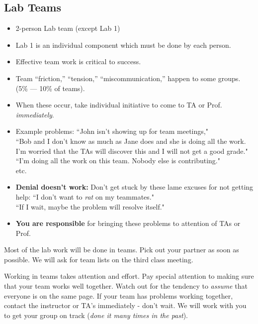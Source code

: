 \documentclass{article}	%
\begin{document}
\subsection{Lab Teams}

\begin{itemize}
        \item  2-person Lab team (except Lab 1)
        \item  Lab 1 is an individual component which must be done by each person. 
        \item Effective team work is critical to success.
        \item Team ``friction,'' ``tension,'' ``miscommunication,''
        happen to some groups. (5\% --- 10\% of teams).
        \item When these occur, take individual initiative to come
        to TA or Prof. {\it immediately}.
        \item Example problems: ``John isn't showing up for team meetings," \\
        ``Bob and I don't know as much as Jane does and
        she is doing all the work.  I'm worried that the TAs will discover
        this and I will not get a good grade." \\
        ``I'm doing all the work on this team.  Nobody else is contributing."\\
        etc.
        \item {\bf Denial doesn't work:} Don't get stuck by these lame excuses
        for not getting help: ``I don't want to {\it rat} on my teammates."\\
        ``If I wait, maybe the problem will resolve itself."
        \item {\bf You are responsible} for bringing these problems to
        attention of TAs or Prof.
\end{itemize}


Most of the lab work will be done in teams. Pick  out your partner as soon as possible.
We will ask for team lists on the third class meeting.

Working in teams takes attention and effort.
Pay special attention to making sure that your team works well together.
Watch out for the tendency to {\it assume } that everyone is on the
same page.  If your team has problems working together, contact the
instructor or TA's immediately - don't wait. 
We will work with you to get your group on track ({\it done it many times in the past}).

\end{document}
